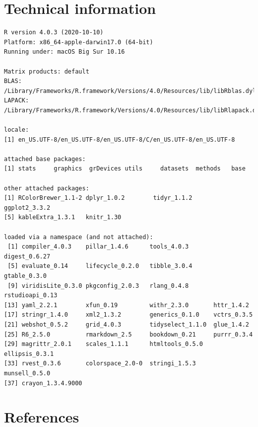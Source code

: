 \documentclass[
]{book}
\begin{document}
\hypertarget{ap:technical}{%
\chapter{Technical information}\label{ap:technical}}

\begin{verbatim}
R version 4.0.3 (2020-10-10)
Platform: x86_64-apple-darwin17.0 (64-bit)
Running under: macOS Big Sur 10.16

Matrix products: default
BLAS:   /Library/Frameworks/R.framework/Versions/4.0/Resources/lib/libRblas.dylib
LAPACK: /Library/Frameworks/R.framework/Versions/4.0/Resources/lib/libRlapack.dylib

locale:
[1] en_US.UTF-8/en_US.UTF-8/en_US.UTF-8/C/en_US.UTF-8/en_US.UTF-8

attached base packages:
[1] stats     graphics  grDevices utils     datasets  methods   base     

other attached packages:
[1] RColorBrewer_1.1-2 dplyr_1.0.2        tidyr_1.1.2        ggplot2_3.3.2     
[5] kableExtra_1.3.1   knitr_1.30        

loaded via a namespace (and not attached):
 [1] compiler_4.0.3    pillar_1.4.6      tools_4.0.3       digest_0.6.27    
 [5] evaluate_0.14     lifecycle_0.2.0   tibble_3.0.4      gtable_0.3.0     
 [9] viridisLite_0.3.0 pkgconfig_2.0.3   rlang_0.4.8       rstudioapi_0.13  
[13] yaml_2.2.1        xfun_0.19         withr_2.3.0       httr_1.4.2       
[17] stringr_1.4.0     xml2_1.3.2        generics_0.1.0    vctrs_0.3.5      
[21] webshot_0.5.2     grid_4.0.3        tidyselect_1.1.0  glue_1.4.2       
[25] R6_2.5.0          rmarkdown_2.5     bookdown_0.21     purrr_0.3.4      
[29] magrittr_2.0.1    scales_1.1.1      htmltools_0.5.0   ellipsis_0.3.1   
[33] rvest_0.3.6       colorspace_2.0-0  stringi_1.5.3     munsell_0.5.0    
[37] crayon_1.3.4.9000
\end{verbatim}

\hypertarget{references}{%
\chapter*{References}\label{references}}
\end{document}
